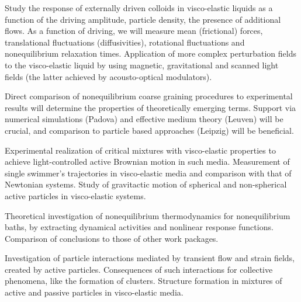 \begin{workpackage}
\begin{tasklist}
\begin{task}[title=Externally driven particles in visco-elastic baths,id=brown-t2,PM=24,lead=USTUTT,wphases=0-24!0.5]
Study the response of externally driven colloids in visco-elastic liquids as a function of the driving amplitude, particle density, the presence of additional flows. As a function of driving, we will
measure mean (frictional) forces, translational fluctuations (diffusivities), rotational
fluctuations and nonequilibrium relaxation times. Application of more complex perturbation fields to the visco-elastic liquid by using magnetic, gravitational and scanned light fields (the latter achieved by acousto-optical modulators).
\end{task}

\begin{task}[title=Theoretical identification of nonequilibrium signatures of the bath,id=brown-t3,PM=24,lead=USTUTT,wphases=0-24!1.0,partners={KUL,UNIPD,ULEI}]
Direct comparison of nonequilibrium coarse graining procedures to experimental results will
determine the properties of theoretically emerging terms. Support via numerical simulations
(Padova) and effective medium theory (Leuven) will be crucial, and comparison to particle
based approaches (Leipzig) will be beneficial.
\end{task}

\begin{task}[title=Self-propelled particles in visco-elastic baths,id=brown-t4,PM=24,lead=USTUTT,wphases=24-48!0.5]
Experimental realization of critical mixtures with visco-elastic properties to achieve light-controlled active Brownian motion in such media. Measurement of single swimmer's trajectories in visco-elastic media and comparison with that of Newtonian systems. Study of gravitactic motion of spherical and non-spherical active particles in visco-elastic systems. 
\end{task}
\begin{task}[title=Nonequilbrium thermodynamics,id=brown-t5,PM=24,lead=USTUTT,wphases=24-48!1.0,partners={KUL,UNIPD,ULEI}]
Theoretical investigation of nonequilibrium thermodynamics for nonequilibrium baths, by
extracting dynamical activities and nonlinear response functions. Comparison of conclusions
to those of other work packages.
\end{task}

\begin{task}[title=Collective behavior of self-propelled particles in visco-elastic baths,id=brown-t6,PM=24,lead=USTUTT,wphases=24-48!0.5]
Investigation of particle interactions mediated by transient flow and strain fields, created by active particles. Consequences of such interactions for collective phenomena, like the formation of clusters. Structure formation in mixtures of active and passive particles in visco-elastic media.  
\end{task}



\end{tasklist}
\end{workpackage}
